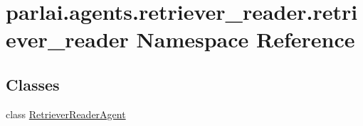 \hypertarget{namespaceparlai_1_1agents_1_1retriever__reader_1_1retriever__reader}{}\section{parlai.\+agents.\+retriever\+\_\+reader.\+retriever\+\_\+reader Namespace Reference}
\label{namespaceparlai_1_1agents_1_1retriever__reader_1_1retriever__reader}
\subsection*{Classes}
\begin{DoxyCompactItemize}
\item 
class \hyperlink{classparlai_1_1agents_1_1retriever__reader_1_1retriever__reader_1_1RetrieverReaderAgent}{Retriever\+Reader\+Agent}
\end{DoxyCompactItemize}
